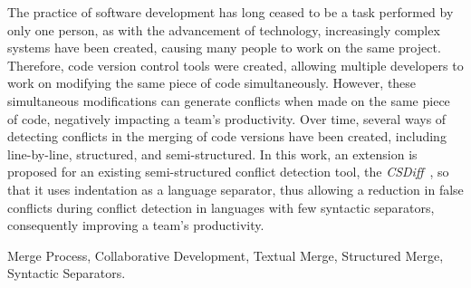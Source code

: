 
\abstract
The practice of software development has long ceased to be a task performed by
only one person, as with the advancement of technology, increasingly complex
systems have been created, causing many people to work on the same project.
Therefore, code version control tools were created, allowing multiple developers
to work on modifying the same piece of code simultaneously. However, these simultaneous
modifications can generate conflicts when made on the same piece of code, negatively
impacting a team's productivity. Over time, several ways of detecting conflicts
in the merging of code versions have been created, including line-by-line, structured,
and semi-structured. In this work, an extension is proposed for an existing
semi-structured conflict detection tool, the \emph{CSDiff}~\cite{clem21},
so that it uses indentation as a language separator, thus allowing a reduction in
false conflicts during conflict detection in languages with few syntactic separators,
consequently improving a team's productivity.
\begin{keywords}
	Merge Process, Collaborative Development, Textual Merge, Structured Merge, Syntactic Separators.
\end{keywords}

